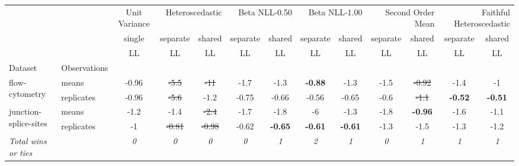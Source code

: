 \begin{tabular}{ll|c|cc|cc|cc|cc|cc}
\toprule
{} & {} & {Unit Variance} & \multicolumn{2}{r}{Heteroscedastic} & \multicolumn{2}{r}{Beta NLL-0.50} & \multicolumn{2}{r}{Beta NLL-1.00} & \multicolumn{2}{r}{Second Order Mean} & \multicolumn{2}{r}{Faithful Heteroscedastic} \\
{} & {} & {single} & {separate} & {shared} & {separate} & {shared} & {separate} & {shared} & {separate} & {shared} & {separate} & {shared} \\
{} & {} & {LL} & {LL} & {LL} & {LL} & {LL} & {LL} & {LL} & {LL} & {LL} & {LL} & {LL} \\
{Dataset} & {Observations} & {} & {} & {} & {} & {} & {} & {} & {} & {} & {} & {} \\
\midrule
\multirow[c]{2}{*}{flow-cytometry} & means & -0.96 & \sout{-5.5} & \sout{-11} & -1.7 & -1.3 & \textbf{-0.88} & -1.3 & -1.5 & \sout{-0.92} & -1.4 & -1 \\
 & replicates & -0.96 & \sout{-5.6} & -1.2 & -0.75 & -0.66 & -0.56 & -0.65 & -0.6 & \sout{-1.1} & \textbf{-0.52} & \textbf{-0.51} \\
\multirow[c]{2}{*}{junction-splice-sites} & means & -1.2 & -1.4 & \sout{-2.4} & -1.7 & -1.8 & -6 & -1.3 & -1.8 & \textbf{-0.96} & -1.6 & -1.1 \\
 & replicates & -1 & \sout{-0.81} & \sout{-0.98} & -0.62 & \textbf{-0.65} & \textbf{-0.61} & \textbf{-0.61} & -1.3 & -1.5 & -1.3 & -1.2 \\
\textit{{Total wins or ties}} &  & \textit{0} & \textit{0} & \textit{0} & \textit{0} & \textit{1} & \textit{2} & \textit{1} & \textit{0} & \textit{1} & \textit{1} & \textit{1} \\
\bottomrule
\end{tabular}
